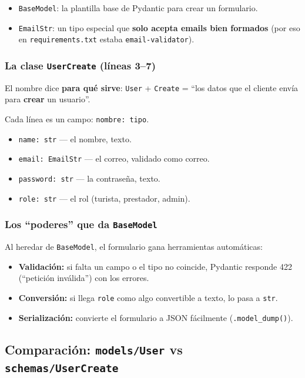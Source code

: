 \documentclass[11pt,a4paper]{article}
\begin{document}
\begin{itemize}
    \item \texttt{BaseModel}: la plantilla base de Pydantic para crear un formulario.
    \item \texttt{EmailStr}: un tipo especial que \textbf{solo acepta emails bien formados}
    (por eso en \texttt{requirements.txt} estaba \texttt{email-validator}).
\end{itemize}

\subsubsection{La clase \texttt{UserCreate} (líneas 3--7)}

El nombre dice \textbf{para qué sirve}: \texttt{User} + \texttt{Create} = ``los datos que el
cliente envía para \textbf{crear} un usuario''.

Cada línea es un campo: \texttt{nombre: tipo}.
\begin{itemize}
    \item \texttt{name: str} --- el nombre, texto.
    \item \texttt{email: EmailStr} --- el correo, validado como correo.
    \item \texttt{password: str} --- la contraseña, texto.
    \item \texttt{role: str} --- el rol (turista, prestador, admin).
\end{itemize}

\subsubsection{Los ``poderes'' que da \texttt{BaseModel}}

Al heredar de \texttt{BaseModel}, el formulario gana herramientas automáticas:

\begin{itemize}
    \item \textbf{Validación:} si falta un campo o el tipo no coincide, Pydantic responde 422
    (``petición inválida'') con los errores.
    \item \textbf{Conversión:} si llega \texttt{role} como algo convertible a texto, lo pasa a \texttt{str}.
    \item \textbf{Serialización:} convierte el formulario a JSON fácilmente (\texttt{.model\_dump()}).
\end{itemize}

\subsection{Comparación: \texttt{models/User} vs \texttt{schemas/UserCreate}}
\end{document}
